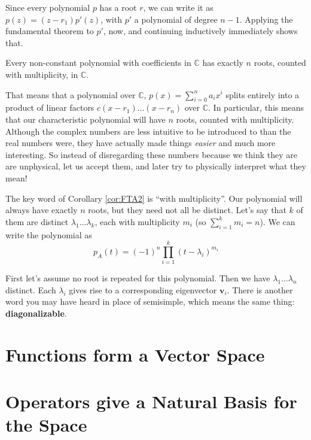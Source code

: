	 Since every polynomial $p$ has a root $r$, we can write it as $p(z) = (z-r_1) p'(z)$, with $p'$ a polynomial of degree $n-1$.
	 Applying the fundamental theorem to $p'$, now, and continuing inductively immediately shows that.
	 \begin{cor}\label{cor:FTA2}
	 	Every non-constant polynomial with coefficients in $\mathbb{C}$ has exactly $n$ roots, counted with multiplicity, in $\mathbb C$. 
	 \end{cor}
	 That means that a polynomial over $\mathbb C$, $p(x) = \sum_{i = 0}^n a_i x^i$ splits entirely into a product of linear factors $c (x-r_1) \dots (x-r_n)$ over $\mathbb C$. In particular, this means that our characteristic polynomial will have $n$ roots, counted with multiplicity. Although the complex numbers are less intuitive to be introduced to than the real numbers were, they have actually made things \emph{easier} and much more interesting. So instead of disregarding these numbers because we think they are are unphysical, let us accept them, and later try to physically interpret what they mean!
	 
	 
	The key word of Corollary \ref{cor:FTA2} is ``with multiplicity''. Our polynomial will always have exactly $n$ roots, but they need not all be distinct. Let's say that $k$ of them are distinct $\lambda_1 \dots \lambda_k$, each with multiplicity $m_i$ (so $\sum_{i=1}^k m_i = n$). We can write the polynomial as
	\begin{equation}
		p_A(t)  = (-1)^n \prod_{i=1}^k (t - \lambda_i)^{m_i}
	\end{equation}
	
	First let's assume no root is repeated for this polynomial. Then we have $\lambda_1 \dots \lambda_n$ distinct. Each $\lambda_i$ gives rise to a corresponding eigenvector $\mathbf v_i$.
	There is another word you may have heard in place of semisimple, which means the same thing: \textbf{diagonalizable}. 




\section{Functions form a Vector Space} %
\label{sec:functions_form_a_vector_space}


\section{Operators give a Natural Basis for the Space} %
\label{sec:operators_give_a_natural_basis_for_the_space}

